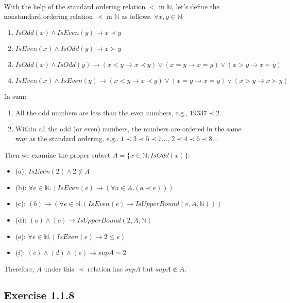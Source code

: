 \documentclass[12pt, letterpaper, oneside]{book}
\begin{document}
With the help of the standard ordering relation $<$ in $\mathbb{N}$, let's define the nonstandard ordering relation
$\prec$ in $\mathbb{N}$ as follows. $\forall x, y \in \mathbb{N}$:
\begin{enumerate}
  \item $IsOdd(x) \land IsEven(y) \rightarrow x \prec y$
  \item $IsEven(x) \land IsOdd(y) \rightarrow x \succ y$
  \item $IsOdd(x) \land IsOdd(y) \rightarrow (x < y \rightarrow x \prec y) \lor (x = y \rightarrow x = y) \lor
          (x > y \rightarrow x \succ y)$
  \item $IsEven(x) \land IsEven(y) \rightarrow (x < y \rightarrow x \prec y) \lor (x = y \rightarrow x = y) \lor
          (x > y \rightarrow x \succ y)$
\end{enumerate}

In sum:
\begin{enumerate}
  \item All the odd numbers are less than the even numbers, e.g., $19337 \prec 2$.
  \item Within all the odd (or even) numbers, the numbers are ordered in the same way as the standard ordering, e.g.,
        $1 \prec 3 \prec 5 \prec 7 \ldots$, $2 \prec 4 \prec 6 \prec 8 \ldots$
\end{enumerate}

Then we examine the proper subset $A = \{ x \in \mathbb{N}: IsOdd(x) \}$:
\begin{itemize}
  \item (a): $IsEven(2) \land 2 \notin A$
  \item (b): $\forall e \in \mathbb{N}. (IsEven(e) \rightarrow (\forall a \in A. (a \prec e)))$
  \item (c): $(b) \rightarrow (\forall e \in \mathbb{N}. (IsEven(e) \rightarrow IsUpperBound(e, A, \mathbb{N})))$
  \item (d): $(a) \land (c) \rightarrow IsUpperBound(2, A, \mathbb{N})$
  \item (e): $\forall e \in \mathbb{N}. (IsEven(e) \rightarrow 2 \le e)$
  \item (f): $(c) \land (d) \land (e) \rightarrow sup A = 2$
\end{itemize}

Therefore, $A$ under this $\prec$ relation has $sup A$ but $sup A \notin A$.

\subsection{Exercise 1.1.8}
\end{document}
